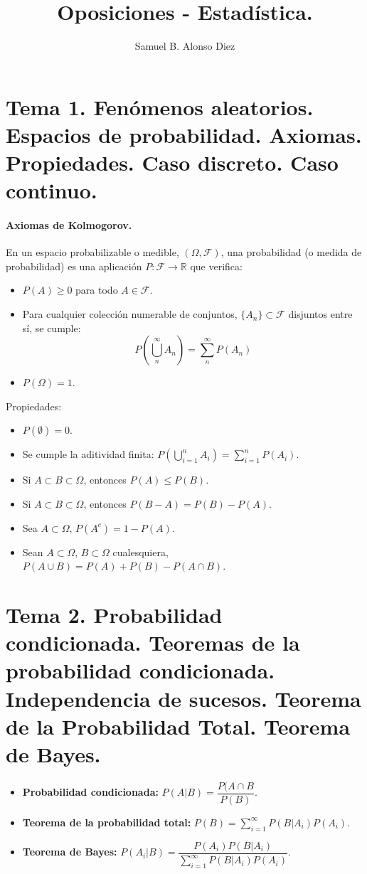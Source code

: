 \documentclass[oneside,spanish,a4paper]{article}
\title{Oposiciones - Estad\'istica.}
\author{Samuel B. Alonso Diez}
\newcommand{\sectioncol}[1]{\section{{\color{blue} #1}}}
\begin{document}
\tableofcontents

\sectioncol{Tema 1. Fen\'omenos aleatorios. Espacios de probabilidad. Axiomas. Propiedades. Caso discreto. Caso continuo.}

\paragraph{Axiomas de Kolmogorov.}

En un espacio probabilizable o medible, $(\Omega, \mathcal{F})$, una probabilidad (o medida de probabilidad) es una aplicaci\'on $P:\mathcal{F}\to\mathbb{R}$ que verifica:

\begin{itemize}
\item $P(A)\geq0$ para todo $A\in\mathcal{F}$.
\item Para cualquier colecci\'on numerable de conjuntos, $\{A_n\}\subset\mathcal{F}$ disjuntos entre s\'i, se cumple:
\[P\left(\bigcup_{n}^{\infty}A_n\right)=\sum_n^{\infty}P(A_n)\]
\item $P(\Omega)=1$.
\end{itemize}

Propiedades:
\begin{itemize}
\item $P(\emptyset)=0$.
\item Se cumple la aditividad finita: $P\left(\bigcup_{i=1}^{n}A_i\right)=\sum_{i=1}^{n}P(A_i)$.
\item Si $A\subset B\subset\Omega$, entonces $P(A)\leq P(B)$.
\item Si $A\subset B\subset\Omega$, entonces $P(B-A)=P(B)-P(A)$.
\item Sea $A\subset\Omega$, $P(A^c)=1-P(A)$.
\item Sean $A\subset\Omega$, $B\subset\Omega$ cualesquiera, $P(A\cup B)=P(A)+P(B)-P(A\cap B)$.
\end{itemize}

\sectioncol{Tema 2. Probabilidad condicionada. Teoremas de la probabilidad condicionada. Independencia de sucesos. Teorema de la Probabilidad Total. Teorema de Bayes.}
\begin{itemize}
\item \textbf{Probabilidad condicionada:} $P(A|B)=\dfrac{P(A\cap B}{P(B)}$.
\item \textbf{Teorema de la probabilidad total:} $P(B)=\sum_{i=1}^{\infty}P(B|A_i)P(A_i)$.
\item \textbf{Teorema de Bayes:} $P(A_i|B)=\dfrac{P(A_i)P(B|A_i)}{\sum_{i=1}^{\infty}P(B|A_i)P(A_i)}$.
\end{itemize}
\end{document}
